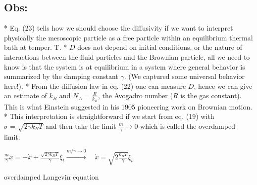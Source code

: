 \subsection*{Obs:}
    * Eq. (23) tells how we should choose the diffusivity if we want to interpret
physically the mesoscopic particle as a free particle within an equilibrium
thermal bath at temper. T.
    * $D$ does not depend on initial conditions, or the nature of interactions
between the fluid particles and the Brownian particle, all we need to know is
that the system is at equilibrium in a system where general behavior is
summarized by the damping constant $\gamma$. (We captured some universal
behavior here!).
    * From the diffusion law in eq. (22) one can measure $D$, hence we can give
an estimate of $k_{B}$ and $N_{A}=\frac{R}{k_{B}}$, the Avogadro number ($R$
is the gas constant). This is what Einstein suggested in his 1905 pioneering
work on Brownian motion.
    * This interpretation is straightforward if we start from eq. (19) with
$\sigma=\sqrt{2 \gamma k_{B} T}$ and then take the limit
$\frac{m}{\gamma} \rightarrow 0$ which is called the overdamped limit:
\begin{DispWithArrows}[displaystyle, format=c]
  $\frac{m}{\gamma} \ddot{x}=-\dot{x}+\frac{\sqrt{2 \gamma k_{B} T}}{\gamma} \xi_{t} \xrightarrow{m / \gamma \rightarrow 0} \quad \dot{x}=\sqrt{2 \frac{k_{B} T}{\gamma}} \xi_{t}$
\end{DispWithArrows}
overdamped Langevin equation

